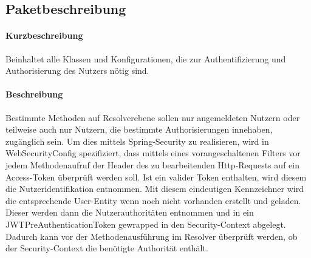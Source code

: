 \subsection*{Paketbeschreibung}%
\paragraph*{Kurzbeschreibung}
Beinhaltet alle Klassen und Konfigurationen, die zur Authentifizierung und Authorisierung des Nutzers nötig sind.
\paragraph*{Beschreibung}
Bestimmte Methoden auf Resolverebene sollen nur angemeldeten Nutzern oder teilweise auch nur Nutzern, die bestimmte Authorisierungen
innehaben, zugänglich sein. Um dies mittels Spring-Security zu realisieren, wird in \dq WebSecurityConfig\dq{} spezifiziert, dass mittels eines vorangeschaltenen Filters vor jedem
Methodenaufruf der Header des zu bearbeitenden Http-Requests auf ein Access-Token überprüft werden soll. Ist ein valider Token enthalten, 
wird diesem die Nutzeridentifikation entnommen. Mit diesem eindeutigen Kennzeichner wird die entsprechende User-Entity
wenn noch nicht vorhanden erstellt und geladen. Dieser werden dann  die Nutzerauthoritäten entnommen und in ein JWTPreAuthenticationToken gewrapped in den Security-Context abgelegt. Dadurch kann vor der Methodenausführung
im Resolver überprüft werden, ob der Security-Context die benötigte Authorität enthält.

